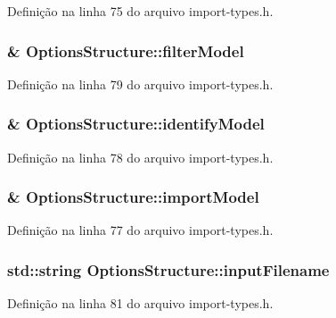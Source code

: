 Definição na linha 75 do arquivo import-\/types.\+h.

\subsubsection[{filter\+Model}]{\& Options\+Structure\+::filter\+Model}\label{struct_options_structure_a2e03e7aa7ade985bc5ce1db094605158}


Definição na linha 79 do arquivo import-\/types.\+h.

\subsubsection[{identify\+Model}]{\& Options\+Structure\+::identify\+Model}\label{struct_options_structure_ac12a3dcd69e9fdff8100cb07abd6b657}


Definição na linha 78 do arquivo import-\/types.\+h.

\subsubsection[{import\+Model}]{\& Options\+Structure\+::import\+Model}\label{struct_options_structure_a8a9a91dca40ba20de3fb1939c8c552c7}


Definição na linha 77 do arquivo import-\/types.\+h.

\subsubsection[{input\+Filename}]{\setlength{\rightskip}{0pt plus 5cm}std\+::string Options\+Structure\+::input\+Filename}\label{struct_options_structure_a3e55b02c0aa8ce2173bdfc09ba3e48af}


Definição na linha 81 do arquivo import-\/types.\+h.

